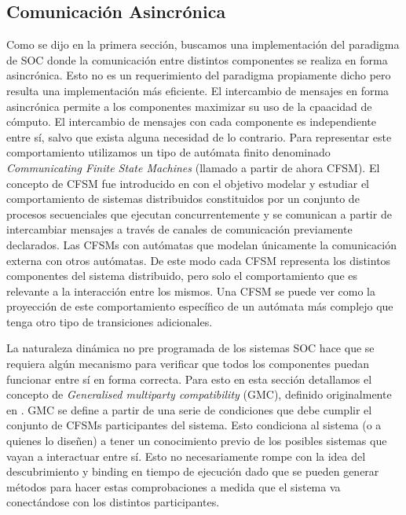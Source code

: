 \subsection{Comunicación Asincrónica}
Como se dijo en la primera sección, buscamos una implementación del paradigma de SOC donde la comunicación entre distintos componentes se realiza en forma asincrónica. Esto no es un requerimiento del paradigma propiamente dicho pero resulta una implementación más eficiente. El intercambio de mensajes en forma asincrónica permite a los componentes maximizar su uso de la cpaacidad de cómputo.  El intercambio de mensajes con cada componente es independiente entre sí, salvo que exista alguna necesidad de lo contrario. Para representar este comportamiento utilizamos un tipo de autómata finito denominado \emph{Communicating Finite State Machines} (llamado a partir de ahora CFSM). El concepto de CFSM fue introducido en \cite{CFSM} con el objetivo modelar y estudiar el comportamiento de sistemas distribuidos constituidos por un conjunto de procesos secuenciales que ejecutan concurrentemente y se comunican a partir de intercambiar mensajes a través de canales de comunicación previamente declarados. Las CFSMs con autómatas que modelan únicamente la comunicación externa con otros autómatas. De este modo cada CFSM representa los distintos componentes del sistema distribuido, pero solo el comportamiento que es relevante a la interacción entre los mismos. Una CFSM se puede ver como la proyección de este comportamiento específico de un autómata más complejo que tenga otro tipo de transiciones adicionales.

La naturaleza dinámica no pre programada de los sistemas SOC hace que se requiera algún mecanismo para verificar que todos los componentes puedan funcionar entre sí en forma correcta. Para esto en esta sección detallamos el concepto de \emph{Generalised multiparty compatibility} (GMC), definido originalmente en \cite{GMC}. GMC se define a partir de una serie de condiciones que debe cumplir el conjunto de CFSMs participantes del sistema. Esto condiciona al sistema (o a quienes lo diseñen) a tener un conocimiento previo de los posibles sistemas que vayan a interactuar entre sí. Esto no necesariamente rompe con la idea del descubrimiento y binding en tiempo de ejecución dado que se pueden generar métodos para hacer estas comprobaciones a medida que el sistema va conectándose con los distintos participantes. %

